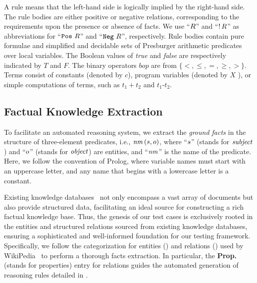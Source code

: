 A rule means that the left-hand side is logically implied by the right-hand side. 
The rule bodies are either positive or negative relations, corresponding to the requirements upon the presence or absence of facts. 
We use ``$R$'' and ``$!\,R$'' as abbreviations for
``${\tt{Pos}}~R$'' and ``${\tt{Neg}}~R$'', respectively. 
Rule bodies contain pure formulae and simplified and decidable sets of Presburger arithmetic predicates over local variables. 
The Boolean values of \emph{true} and \emph{false} are respectively indicated by $T$ and $F$. 
The binary operators $bop$ are from $\{ {<}, {\leq}, {=}, {\geq}, {>} \}$. 
Terms consist of constants (denoted by $c$), program variables (denoted by $X$ %
), or simple computations of terms, such as $t_1{\plus} t_2$ and $t_1\text{-}t_2$. 





\subsection{Factual Knowledge Extraction}
\label{knowledge} 
To facilitate an automated reasoning system, we extract the \emph{ground facts} in the structure of three-element predicates, i.e., $\mathit{\mathit{nm}}\,(s,o)$, where ``$s$'' (stands for $\mathit{subject}$) and ``$o$'' (stands for $\mathit{object}$) are entities, and ``$\mathit{nm}$'' is the name of the predicate. 
Here, we follow the convention of Prolog, where variable names must start with an uppercase letter, and any name that begins with a lowercase letter is a constant. %

Existing knowledge databases~\cite{freebase, DBpedia, Yago, WordNet} not only encompass a vast array of documents but also provide structured data, facilitating an ideal source for constructing a rich factual knowledge base. 
Thus, the genesis of our test cases is exclusively rooted in the entities and structured relations sourced from existing knowledge databases, ensuring a sophisticated and well-informed foundation for our testing framework. 
Specifically, we follow the categorization for entities () and relations () used by WikiPedia~\cite{DBpedia} to perform a thorough facts extraction. 
In particular, the {\small\textbf{Prop.}} (stands for properties) entry for relations guides the automated generation of reasoning rules detailed in .

